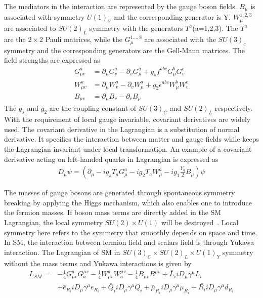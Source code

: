 The mediators in the interaction are represented by the gauge boson fields. $B_{\mu}$ is associated with symmetry $U(1)_{Y}$ and the corresponding generator is Y. $W_{\mu}^{1,2,3}$ are associated to $SU(2)_{L}$ symmetry with the generators $T^{a}$(a=1,2,3). The $T^{a}$ are the $2\times2$ Pauli matrices, while the $G_{\mu}^{1...,8}$ are associated with the $SU(3)_{c}$ symmetry and the corresponding generators are the Gell-Mann matrices.  The field strengths are expressed as 
\begin{equation}
  \begin{aligned}
G^{a}_{\mu v}&=\partial_{\mu}G^{a}_{v}-\partial_{v}G^{a}_{\mu}+g_{s}f^{abc}G^{b}_{\mu}G^{c}_{v}\\
W^{a}_{\mu v}&=\partial_{\mu}W^{a}_{v}-\partial_{v}W^{a}_{\mu}+g_{2}\epsilon^{abc}W^{b}_{\mu}W^{c}_{v}\\
B_{\mu v}       &=\partial_{\mu}B_{v}-\partial_{v}B_{\mu}
  \end{aligned}
\end{equation}
The $g_{s}$ and $g_{2}$ are the coupling constant of $SU(3)_{C}$ and $SU(2)_{L}$ respectively. With the requirement of local gauge invariable, covariant derivatives are widely used. The covariant derivative in the Lagrangian is a substitution of normal derivative. It specifies the interaction between matter and gauge fields while keeps the Lagrangian invariant under local transformation. An example of a covariant derivative acting on left-handed quarks in Lagrangian is expressed as
\begin{equation}
  \begin{aligned}
D_{\mu}\psi = (\partial_{\mu}-ig_{s}T_{a}G^{a}_{\mu}-ig_{2}T_{a}W^{a}_{\mu}-ig_{1}\frac{Y_{q}}{2}B_{\mu})\psi
  \end{aligned}
\end{equation} 

The masses of gauge bosons are generated through spontaneous symmetry breaking by applying the Higgs mechanism, which also enables one to introduce the fermion masses. If boson mass terms are directly added in the SM Lagrangian, the local symmetry $SU(2)\times U(1)$ will be destroyed~\cite{DJOUADI20081}. Local symmetry here refers to the symmetry that smoothly depends on space and time. In SM, the interaction between fermion field and scalars field is through Yukawa interaction. The Lagrangian of SM in $SU(3)_{C}\times SU(2)_{L}\times U(1)_{Y}$ symmetry without the mass terms and Yukawa interactions is given by
 \begin{equation}
  \begin{aligned}
L_{SM}=&-\frac{1}{4}G^{a}_{\mu v}G^{\mu v}_{a}-\frac{1}{4}W^{a}_{\mu v}W^{\mu v}_{a}-\frac{1}{4}B_{\mu v}B^{\mu v}+\bar{L}_{i}iD_{\mu}\gamma^{\mu}L_{i}\\
              &+\bar{e}_{R_{i}}iD_{\mu}\gamma^{\mu}e_{R_{i}}+\bar{Q}_{i}iD_{\mu}\gamma^{\mu}Q_{i}+\bar{\mu}_{R_{i}}iD_{\mu}\gamma^{\mu}\mu_{R_{i}}+\bar{R_{i}}iD_{\mu}\gamma^{\mu}d_{R_{i}}
  \end{aligned}
\end{equation} 






